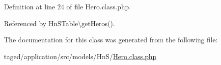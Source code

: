 Definition at line 24 of file Hero.\+class.\+php.



Referenced by Hn\+S\+Table\textbackslash{}get\+Heros().



The documentation for this class was generated from the following file\+:\begin{DoxyCompactItemize}
\item 
taged/application/src/models/\+Hn\+S/\hyperlink{_hero_8class_8php}{Hero.\+class.\+php}\end{DoxyCompactItemize}
